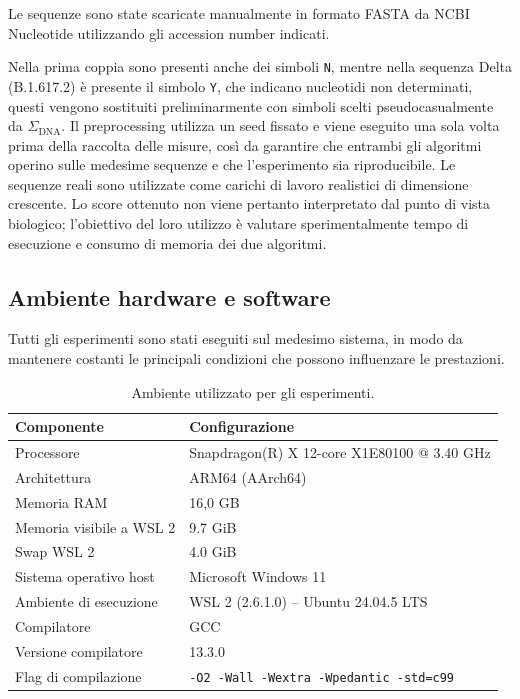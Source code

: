 Le sequenze sono state scaricate manualmente in formato FASTA da NCBI Nucleotide utilizzando gli accession number indicati.

Nella prima coppia sono presenti anche dei simboli \texttt{N}, mentre nella sequenza Delta (B.1.617.2) è presente il simbolo \texttt{Y}, che indicano nucleotidi non determinati, questi vengono sostituiti preliminarmente 
con simboli scelti pseudocasualmente da $\Sigma_{\text{DNA}}$. Il preprocessing utilizza un seed fissato e viene eseguito una sola
volta prima della raccolta delle misure, così da garantire che entrambi gli algoritmi operino sulle medesime sequenze e che l'esperimento sia riproducibile.
Le sequenze reali sono utilizzate come carichi di lavoro realistici di dimensione crescente. Lo score ottenuto non viene pertanto 
interpretato dal punto di vista biologico; l'obiettivo del loro utilizzo è valutare sperimentalmente tempo di esecuzione e consumo di memoria
dei due algoritmi.

\subsection{Ambiente hardware e software}

Tutti gli esperimenti sono stati eseguiti sul medesimo sistema, in modo da mantenere costanti le principali condizioni che possono
influenzare le prestazioni.

\begin{table}[h]
    \centering
    \begin{tabular}{ll}
        \hline
        \textbf{Componente} & \textbf{Configurazione} \\
        \hline
        Processore & Snapdragon(R) X 12-core X1E80100 @ 3.40 GHz \\
        Architettura & ARM64 (AArch64) \\
        Memoria RAM & 16,0 GB \\
        Memoria visibile a WSL 2 & 9.7 GiB \\
        Swap WSL 2 & 4.0 GiB \\
        Sistema operativo host & Microsoft Windows 11 \\
        Ambiente di esecuzione & WSL 2 (2.6.1.0) -- Ubuntu 24.04.5 LTS \\
        Compilatore & GCC \\
        Versione compilatore & 13.3.0 \\
        Flag di compilazione & \texttt{-O2 -Wall -Wextra -Wpedantic -std=c99} \\
        \hline
    \end{tabular}
    \caption{Ambiente utilizzato per gli esperimenti.}
    \label{tab:ambiente}
\end{table}

